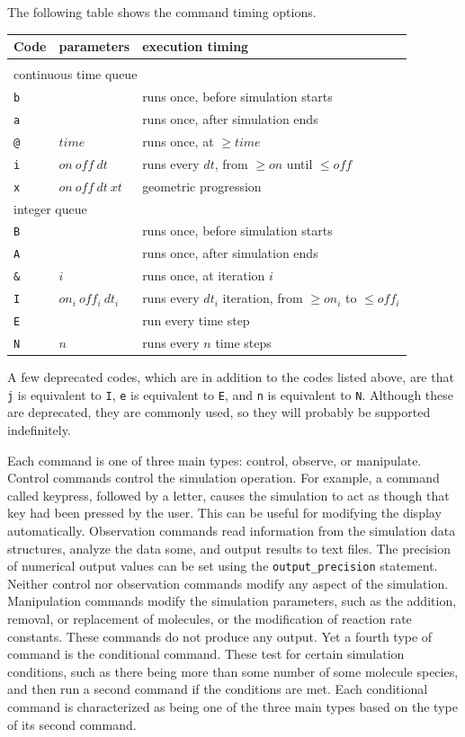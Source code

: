 \documentclass {scrbook}
\newcommand {\ttt} {\texttt}
\begin{document}
The following table shows the command timing options.

\begin{longtable}[c]{lll}
Code & parameters & execution timing\\
\hline\\
\multicolumn{3}{l}{continuous time queue}\\
\ttt{b} &  & runs once, before simulation starts\\
\ttt{a} &  & runs once, after simulation ends\\
\ttt{@} & $time$ & runs once, at $\geq time$\\
\ttt{i} & $on\ off\ dt$ & runs every $dt$, from $\geq on$ until $\leq off$\\
\ttt{x} & $on\ off\ dt\ xt$ & geometric progression\\
\multicolumn{3}{l}{integer queue}\\
\ttt{B} &  & runs once, before simulation starts\\
\ttt{A} &  & runs once, after simulation ends\\
\ttt{\&} & $i$ & runs once, at iteration $i$\\
\ttt{I} & $on_i\ off_i\ dt_i$ & runs every $dt_i$ iteration, from $\geq on_i$ to $\leq off_i$\\
\ttt{E} &  & run every time step\\
\ttt{N} & $n$ & runs every $n$ time steps
\end{longtable}

A few deprecated codes, which are in addition to the codes listed above, are that \ttt{j} is equivalent to \ttt{I}, \ttt{e} is equivalent to \ttt{E}, and \ttt{n} is equivalent to \ttt{N}. Although these are deprecated, they are commonly used, so they will probably be supported indefinitely.

Each command is one of three main types: control, observe, or manipulate. Control commands control the simulation operation. For example, a command called keypress, followed by a letter, causes the simulation to act as though that key had been pressed by the user. This can be useful for modifying the display automatically. Observation commands read information from the simulation data structures, analyze the data some, and output results to text files. The precision of numerical output values can be set using the \ttt{output\_precision} statement. Neither control nor observation commands modify any aspect of the simulation. Manipulation commands modify the simulation parameters, such as the addition, removal, or replacement of molecules, or the modification of reaction rate constants. These commands do not produce any output. Yet a fourth type of command is the conditional command. These test for certain simulation conditions, such as there being more than some number of some molecule species, and then run a second command if the conditions are met. Each conditional command is characterized as being one of the three main types based on the type of its second command.
\end{document}
